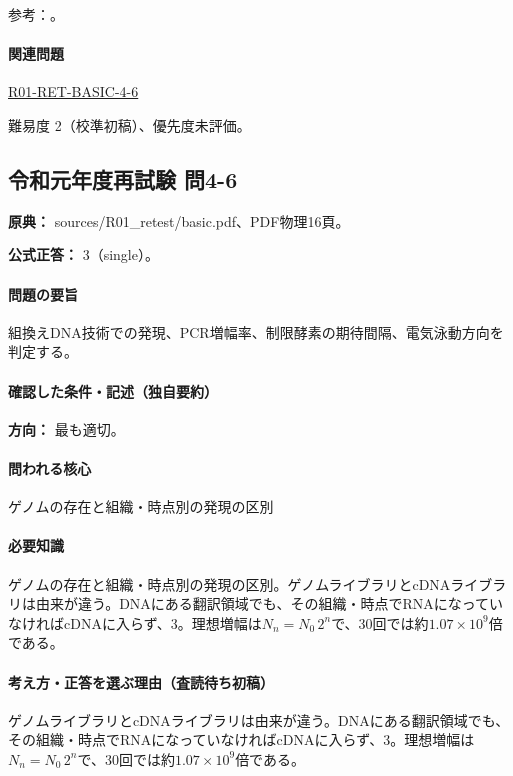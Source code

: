 \par 参考：\cite{neb_pcr,fda_insulin,neb_ecori,nhgri_cdna}。

\paragraph{関連問題} \hyperref[q:r01-ret-basic-4-6]{R01-RET-BASIC-4-6}

\par 難易度 2（校準初稿）、優先度未評価。

\subsection{令和元年度再試験 問4-6}
\label{q:r01-ret-basic-4-6}

\noindent\textbf{原典：} sources/R01\_retest/basic.pdf、PDF物理16頁。

\textbf{公式正答：} 3（single）。

\paragraph{問題の要旨} 組換えDNA技術での発現、PCR増幅率、制限酵素の期待間隔、電気泳動方向を判定する。

\paragraph{確認した条件・記述（独自要約）}\mbox{}\par

\noindent\textbf{方向：} 最も適切。\par

\paragraph{問われる核心} ゲノムの存在と組織・時点別の発現の区別

\paragraph{必要知識} ゲノムの存在と組織・時点別の発現の区別。ゲノムライブラリとcDNAライブラリは由来が違う。DNAにある翻訳領域でも、その組織・時点でRNAになっていなければcDNAに入らず、3。理想増幅は\(N_n=N_0\,2^n\)で、30回では約\(1.07\times10^9\)倍である。

\paragraph{考え方・正答を選ぶ理由（査読待ち初稿）} ゲノムライブラリとcDNAライブラリは由来が違う。DNAにある翻訳領域でも、その組織・時点でRNAになっていなければcDNAに入らず、3。理想増幅は\(N_n=N_0\,2^n\)で、30回では約\(1.07\times10^9\)倍である。

